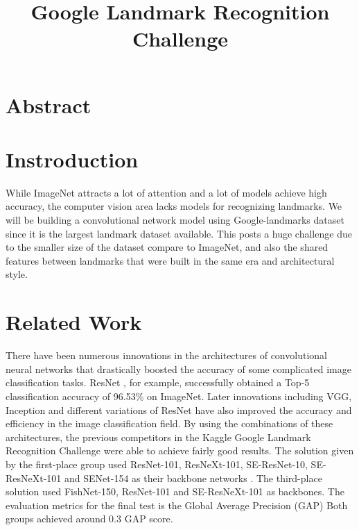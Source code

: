 \documentclass[10pt,twocolumn,letterpaper]{article}
\begin{document}
\title{Google Landmark Recognition Challenge}  %

\maketitle
\thispagestyle{empty}


\section{Abstract}



\section{Instroduction}
While ImageNet attracts a lot of attention and a lot of models achieve high accuracy, the computer vision area lacks models for recognizing landmarks. We will be building a convolutional network model using Google-landmarks dataset since it is the largest landmark dataset available. This posts a huge challenge due to the smaller size of the dataset compare to ImageNet\cite{ILSVRC15}, and also the shared features between landmarks that were built in the same era and architectural style. 

\section{Related Work}

There have been numerous innovations in the architectures of convolutional neural networks that drastically boosted the accuracy of some complicated image classification tasks. ResNet \cite{He_2016}, for example, successfully obtained a Top-5 classification accuracy of 96.53\% on ImageNet. Later innovations including VGG, Inception and different variations of ResNet have also improved the accuracy and efficiency in the image classification field. By using the combinations of these architectures, the previous competitors in the Kaggle Google Landmark Recognition Challenge \cite{Kaggle} were able to achieve fairly good results. The solution given by the first-place group used ResNet-101, ResNeXt-101, SE-ResNet-10, SE-ResNeXt-101 and SENet-154 as their backbone networks \cite{gu2019team}. The third-place solution used FishNet-150, ResNet-101 and SE-ResNeXt-101 as backbones. The evaluation metrics for the final test is the Global Average Precision (GAP) \cite{Kaggle} Both groups achieved around 0.3 GAP score. 
\end{document}
